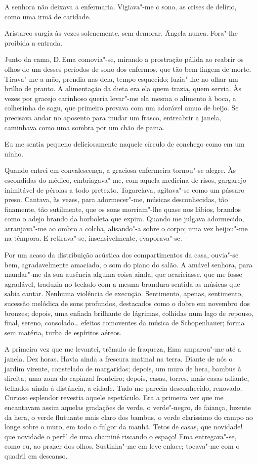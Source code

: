 A senhora não deixava a enfermaria. Vigiava"-me o sono,
as crises de delírio, como uma irmã de caridade. 

Aristarco surgia às
vezes solenemente, sem demorar. Ângela nunca. Fora"-lhe proibida a
entrada. 

Junto da cama, D.\,Ema comovia"-se, mirando a prostração
pálida ao reabrir os olhos de um desses períodos de sono dos enfermos,
que tão bem fingem de morte. Tirava"-me a mão, prendia nas dela, tempo
esquecido; luzia"-lhe no olhar um brilho de pranto. A alimentação da
dieta era ela quem trazia, quem servia. Às vezes por gracejo carinhoso
queria levar"-me ela mesma o alimento à boca, a colherinha de sagu,
que primeiro provava com um adorável amuo de beijo. Se precisava andar
no aposento para mudar um frasco, entreabrir a janela, caminhava como
uma sombra por um chão de paina. 

Eu me sentia pequeno deliciosamente
naquele círculo de conchego como em um ninho. 

Quando entrei em
convalescença, a graciosa enfermeira tornou"-se alegre. Às escondidas
do médico, embriagava"-me, com aquela medicina de risos, gargarejo
inimitável de pérolas a todo pretexto. Tagarelava, agitava"-se como um
pássaro preso. Cantava, às vezes, para adormecer"-me, músicas
desconhecidas, tão finamente, tão sutilmente, que os sons morriam"-lhe
quase nos lábios, brandos como o adejo brando da borboleta que expira.
Quando me julgava adormecido, arranjava"-me ao ombro a colcha,
alisando"-a sobre o corpo; uma vez beijou"-me na têmpora. E
retirava"-se, insensivelmente, evaporava"-se.

Por um acaso da distribuição acústica dos compartimentos da casa,
ouvia"-se bem, agradavelmente amaciado, o som do piano do salão. A
amável senhora, para mandar"-me da sua ausência alguma coisa ainda,
que acariciasse, que me fosse agradável, traduzia no teclado com a
mesma brandura sentida as músicas que sabia cantar. Nenhuma violência
de execução. Sentimento, apenas, sentimento, sucessão melódica de sons
profundos, destacados como o dobre em novembro dos bronzes; depois, uma
enfiada brilhante de lágrimas, colhidas num lago de repouso, final,
sereno, consolado\ldots{} efeitos comoventes da música de Schopenhauer;
forma sem matéria, turba de espíritos aéreos. 

A primeira vez que me
levantei, trêmulo de fraqueza, Ema amparou"-me até a janela. Dez
horas. Havia ainda a frescura matinal na terra. Diante de nós o jardim
virente, constelado de margaridas; depois, um muro de hera, bambus à
direita; uma zona do capinzal fronteiro; depois, casas, torres, mais
casas adiante, telhados ainda à distância, a cidade. Tudo me parecia
desconhecido, renovado. Curioso esplendor revestia aquele espetáculo.
Era a primeira vez que me encantavam assim aquelas gradações de verde,
o verde"-negro, de faiança, luzente da hera, o verde flutuante mais
claro dos bambus, o verde claríssimo do campo ao longe sobre o muro, em
todo o fulgor da manhã. Tetos de casas, que novidade! que novidade o
perfil de uma chaminé riscando o espaço! Ema entregava"-se, como eu,
ao prazer dos olhos. Sustinha"-me em leve enlace; tocava"-me com o
quadril em descanso. 


